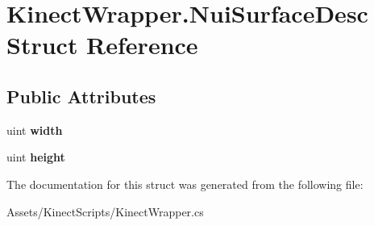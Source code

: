 \hypertarget{struct_kinect_wrapper_1_1_nui_surface_desc}{}\section{Kinect\+Wrapper.\+Nui\+Surface\+Desc Struct Reference}
\label{struct_kinect_wrapper_1_1_nui_surface_desc}
\subsection*{Public Attributes}
\begin{DoxyCompactItemize}
\item 
\mbox{\label{struct_kinect_wrapper_1_1_nui_surface_desc_a6b46bd248de10a081e430f5fc7c5113e}} 
uint {\bfseries width}
\item 
\mbox{\label{struct_kinect_wrapper_1_1_nui_surface_desc_a12cb7dbf93c38836a12d5e0b1909acbc}} 
uint {\bfseries height}
\end{DoxyCompactItemize}


The documentation for this struct was generated from the following file\+:\begin{DoxyCompactItemize}
\item 
Assets/\+Kinect\+Scripts/Kinect\+Wrapper.\+cs\end{DoxyCompactItemize}
